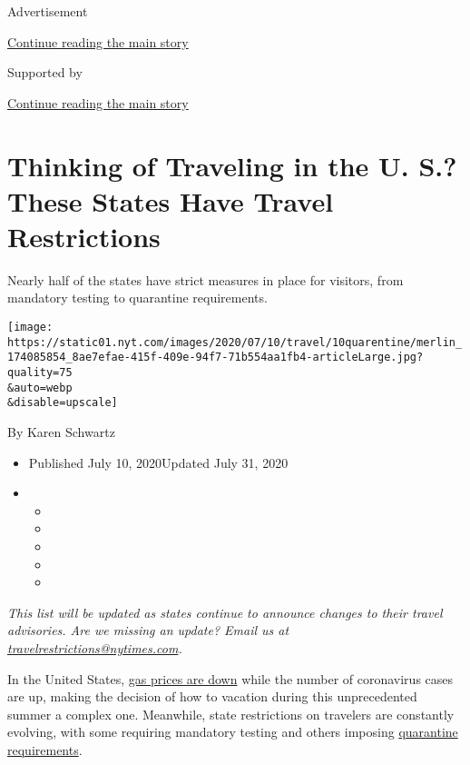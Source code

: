 Advertisement

\protect\hyperlink{after-top}{Continue reading the main story}

Supported by

\protect\hyperlink{after-sponsor}{Continue reading the main story}

\hypertarget{thinking-of-traveling-in-the-u-s-these-states-have-travel-restrictions}{%
\section{Thinking of Traveling in the U. S.? These States Have Travel
Restrictions}\label{thinking-of-traveling-in-the-u-s-these-states-have-travel-restrictions}}

Nearly half of the states have strict measures in place for visitors,
from mandatory testing to quarantine requirements.

\texttt{[image: https://static01.nyt.com/images/2020/07/10/travel/10quarentine/merlin\_174085854\_8ae7efae-415f-409e-94f7-71b554aa1fb4-articleLarge.jpg?quality=75\\\&auto=webp\\\&disable=upscale]}

By Karen Schwartz

\begin{itemize}
\item
  Published July 10, 2020Updated July 31, 2020
\item
  \begin{itemize}
  \item
  \item
  \item
  \item
  \item
  \end{itemize}
\end{itemize}

\emph{This list will be updated as states continue to announce changes
to their travel advisories. Are we missing an update? Email us at}
\href{mailto:travelrestrictions@nytimes.com}{\emph{travelrestrictions@nytimes.com}}\emph{.}

In the United States,
\href{https://gasprices.aaa.com/national-average-decreases-as-gas-demand-remains-low/}{gas
prices are down} while the number of coronavirus cases are up, making
the decision of how to vacation during this unprecedented summer a
complex one. Meanwhile, state restrictions on travelers are constantly
evolving, with some requiring mandatory testing and others imposing
\href{https://www.cdc.gov/quarantine/index.html}{quarantine
requirements}.

